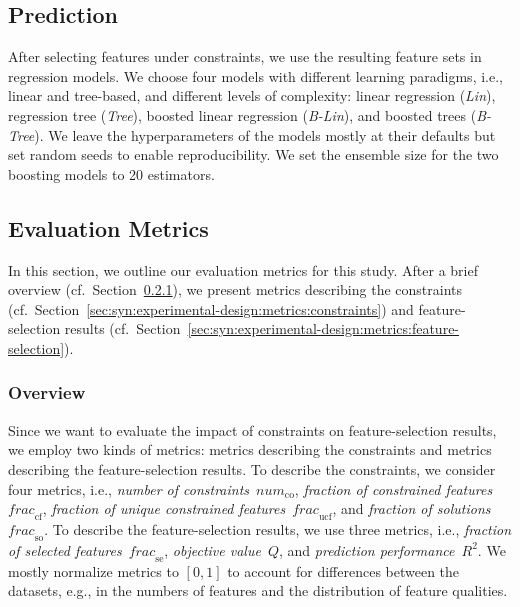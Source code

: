 \subsection{Prediction}
\label{sec:syn:experimental-design:prediction}

After selecting features under constraints, we use the resulting feature sets in regression models.
We choose four models with different learning paradigms, i.e., linear and tree-based, and different levels of complexity:
linear regression (\emph{Lin}), regression tree (\emph{Tree}), boosted linear regression (\emph{B-Lin}), and boosted trees (\emph{B-Tree}).
We leave the hyperparameters of the models mostly at their defaults but set random seeds to enable reproducibility.
We set the ensemble size for the two boosting models to 20 estimators.

\subsection{Evaluation Metrics}
\label{sec:syn:experimental-design:metrics}

In this section, we outline our evaluation metrics for this study.
After a brief overview (cf.~Section~\ref{sec:syn:experimental-design:metrics:overview}), we present metrics describing the constraints (cf.~Section~\ref{sec:syn:experimental-design:metrics:constraints}) and feature-selection results (cf.~Section~\ref{sec:syn:experimental-design:metrics:feature-selection}).

\subsubsection{Overview}
\label{sec:syn:experimental-design:metrics:overview}

Since we want to evaluate the impact of constraints on feature-selection results, we employ two kinds of metrics:
metrics describing the constraints and metrics describing the feature-selection results.
To describe the constraints, we consider four metrics, i.e., \emph{number of constraints}~$\mathit{num}_{\text{co}}$, \emph{fraction of constrained features}~$\mathit{frac}_{\text{cf}}$, \emph{fraction of unique constrained features}~$\mathit{frac}_{\text{ucf}}$, and \emph{fraction of solutions}~$\mathit{frac}_{\text{so}}$.
To describe the feature-selection results, we use three metrics, i.e., \emph{fraction of selected features}~$\mathit{frac}_{\text{se}}$, \emph{objective value}~$Q$, and \emph{prediction performance}~$R^2$.
We mostly normalize metrics to $[0, 1]$ to account for differences between the datasets, e.g., in the numbers of features and the distribution of feature qualities.

